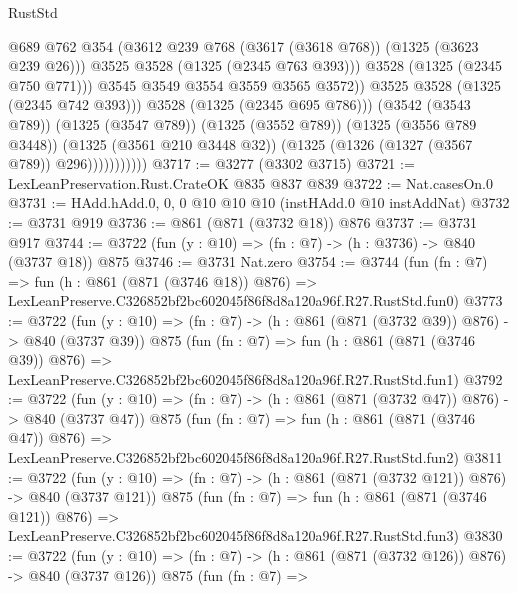 \begin{lexlean}{RustStd}
\begin{coremodule}
                                  @689
                                  @762
                                  @354
                                  (@3612 @239 @768 (@3617 (@3618 @768)) (@1325 (@3623 @239 @26)))
                                  @3525
                                  @3528
                                  (@1325 (@2345 @763 @393)))
                                @3528
                                (@1325 (@2345 @750 @771)))
                              @3545
                              @3549
                              @3554
                              @3559
                              @3565
                              @3572))
                          @3525
                          @3528
                          (@1325 (@2345 @742 @393)))
                        @3528
                        (@1325 (@2345 @695 @786)))
                      (@3542 (@3543 @789))
                      (@1325 (@3547 @789))
                      (@1325 (@3552 @789))
                      (@1325 (@3556 @789 @3448))
                      (@1325 (@3561 @210 @3448 @32))
                      (@1325 (@1326 (@1327 (@3567 @789)) @296)))))))))))
@3717 := @3277 (@3302 @3715)
@3721 := LexLeanPreservation.Rust.CrateOK @835 @837 @839
@3722 := Nat.casesOn.{0}
@3731 := HAdd.hAdd.{0, 0, 0} @10 @10 @10 (instHAdd.{0} @10 instAddNat)
@3732 := @3731 @919
@3736 := @861 (@871 (@3732 @18)) @876
@3737 := @3731 @917
@3744 := @3722 (fun (y : @10) => (fn : @7) -> (h : @3736) -> @840 (@3737 @18)) @875
@3746 := @3731 Nat.zero
@3754 := @3744
    (fun (fn : @7) =>
    fun (h : @861 (@871 (@3746 @18)) @876) =>
    LexLeanPreserve.C326852bf2bc602045f86f8d8a120a96f.R27.RustStd.fun0)
@3773 := @3722
    (fun (y : @10) => (fn : @7) -> (h : @861 (@871 (@3732 @39)) @876) -> @840 (@3737 @39))
    @875
    (fun (fn : @7) =>
    fun (h : @861 (@871 (@3746 @39)) @876) =>
    LexLeanPreserve.C326852bf2bc602045f86f8d8a120a96f.R27.RustStd.fun1)
@3792 := @3722
    (fun (y : @10) => (fn : @7) -> (h : @861 (@871 (@3732 @47)) @876) -> @840 (@3737 @47))
    @875
    (fun (fn : @7) =>
    fun (h : @861 (@871 (@3746 @47)) @876) =>
    LexLeanPreserve.C326852bf2bc602045f86f8d8a120a96f.R27.RustStd.fun2)
@3811 := @3722
    (fun (y : @10) => (fn : @7) -> (h : @861 (@871 (@3732 @121)) @876) -> @840 (@3737 @121))
    @875
    (fun (fn : @7) =>
    fun (h : @861 (@871 (@3746 @121)) @876) =>
    LexLeanPreserve.C326852bf2bc602045f86f8d8a120a96f.R27.RustStd.fun3)
@3830 := @3722
    (fun (y : @10) => (fn : @7) -> (h : @861 (@871 (@3732 @126)) @876) -> @840 (@3737 @126))
    @875
    (fun (fn : @7) =>

\end{coremodule}
\end{lexlean}
